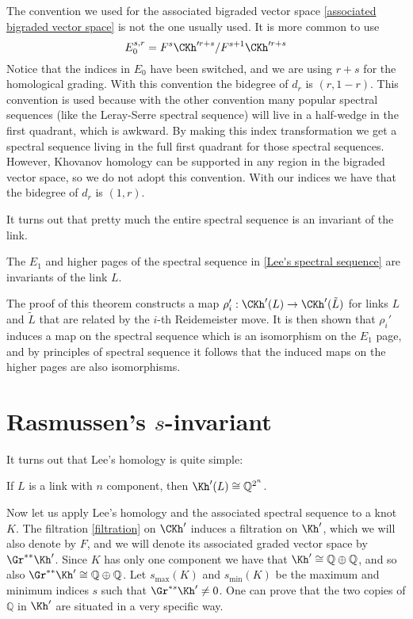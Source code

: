The convention we used for the associated bigraded vector space \eqref{associated bigraded vector space} is not the one usually used. It is more common to use
\[ E_0^{s,r} = F^s \CKh'^{r+s} / F^{s+1} \CKh'^{r+s} \]
Notice that the indices in $E_0$ have been switched, and we are using $r+s$ for the homological grading. With this convention the bidegree of $d_r$ is $(r,1-r)$. This convention is used because with the other convention many popular spectral sequences (like the Leray-Serre spectral sequence) will live in a half-wedge in the first quadrant, which is awkward. By making this index transformation we get a spectral sequence living in the full first quadrant for those spectral sequences. However, Khovanov homology can be supported in any region in the bigraded vector space, so we do not adopt this convention. With our indices we have that the bidegree of $d_r$ is $(1,r)$.

It turns out that pretty much the entire spectral sequence is an invariant of the link.

\begin{thm}
The $E_1$ and higher pages of the spectral sequence in \ref{Lee's spectral sequence} are invariants of the link $L$.
\end{thm}

The proof of this theorem constructs a map $\rho_i' : \CKh'(L) \rightarrow \CKh'(\tilde{L})$ for links $L$ and $\tilde{L}$ that are related by the $i$-th Reidemeister move. It is then shown that $\rho_i'$ induces a map on the spectral sequence which is an isomorphism on the $E_1$ page, and by principles of spectral sequence it follows that the induced maps on the higher pages are also isomorphisms.



\section{Rasmussen's $s$-invariant}

It turns out that Lee's homology is quite simple:

\begin{thm}
If $L$ is a link with $n$ component, then $\Kh'(L) \cong \mathbb Q^{2^n}$.
\end{thm}

Now let us apply Lee's homology and the associated spectral sequence to a knot $K$. The filtration \eqref{filtration} on $\CKh'$ induces a filtration on $\Kh'$, which we will also denote by $F$, and we will denote its associated graded vector space by $\Gr^{**} \Kh'$. Since $K$ has only one component we have that $\Kh' \cong \mathbb Q \oplus \mathbb Q$, and so also $\Gr^{**} \Kh' \cong \mathbb Q \oplus \mathbb Q$. Let $s_{\max}(K)$ and $s_{\min}(K)$ be the maximum and minimum indices $s$ such that $\Gr^{*s} \Kh' \neq 0$. One can prove that the two copies of $\mathbb Q$ in $\Kh'$ are situated in a very specific way.

